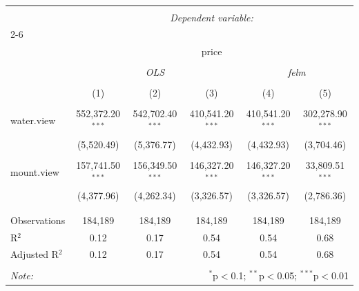 
\begin{table}[!htbp] \centering 
  \caption{} 
  \label{} 
\begin{tabular}{@{\extracolsep{5pt}}lccccc} 
\\[-1.8ex]\hline 
\hline \\[-1.8ex] 
 & \multicolumn{5}{c}{\textit{Dependent variable:}} \\ 
\cline{2-6} 
\\[-1.8ex] & \multicolumn{5}{c}{price} \\ 
\\[-1.8ex] & \multicolumn{3}{c}{\textit{OLS}} & \multicolumn{2}{c}{\textit{felm}} \\ 
\\[-1.8ex] & (1) & (2) & (3) & (4) & (5)\\ 
\hline \\[-1.8ex] 
 water.view & 552,372.20$^{***}$ & 542,702.40$^{***}$ & 410,541.20$^{***}$ & 410,541.20$^{***}$ & 302,278.90$^{***}$ \\ 
  & (5,520.49) & (5,376.77) & (4,432.93) & (4,432.93) & (3,704.46) \\ 
  & & & & & \\ 
 mount.view & 157,741.50$^{***}$ & 156,349.50$^{***}$ & 146,327.20$^{***}$ & 146,327.20$^{***}$ & 33,809.51$^{***}$ \\ 
  & (4,377.96) & (4,262.34) & (3,326.57) & (3,326.57) & (2,786.36) \\ 
  & & & & & \\ 
\hline \\[-1.8ex] 
Observations & 184,189 & 184,189 & 184,189 & 184,189 & 184,189 \\ 
R$^{2}$ & 0.12 & 0.17 & 0.54 & 0.54 & 0.68 \\ 
Adjusted R$^{2}$ & 0.12 & 0.17 & 0.54 & 0.54 & 0.68 \\ 
\hline 
\hline \\[-1.8ex] 
\textit{Note:}  & \multicolumn{5}{r}{$^{*}$p$<$0.1; $^{**}$p$<$0.05; $^{***}$p$<$0.01} \\ 
\end{tabular} 
\end{table} 
